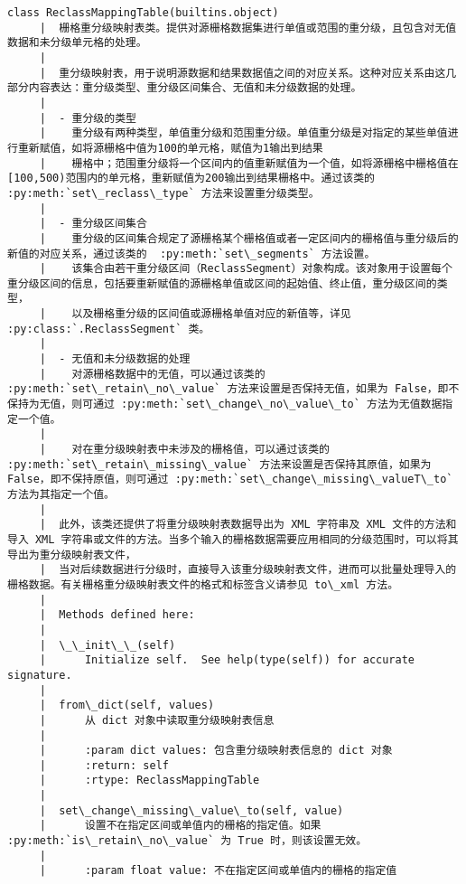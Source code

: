 \documentclass[11pt]{article}
\begin{document}
\begin{Verbatim}[commandchars=\\\{\}]
    class ReclassMappingTable(builtins.object)
     |  栅格重分级映射表类。提供对源栅格数据集进行单值或范围的重分级，且包含对无值数据和未分级单元格的处理。
     |  
     |  重分级映射表，用于说明源数据和结果数据值之间的对应关系。这种对应关系由这几部分内容表达：重分级类型、重分级区间集合、无值和未分级数据的处理。
     |  
     |  - 重分级的类型
     |    重分级有两种类型，单值重分级和范围重分级。单值重分级是对指定的某些单值进行重新赋值，如将源栅格中值为100的单元格，赋值为1输出到结果
     |    栅格中；范围重分级将一个区间内的值重新赋值为一个值，如将源栅格中栅格值在[100,500)范围内的单元格，重新赋值为200输出到结果栅格中。通过该类的 :py:meth:`set\_reclass\_type` 方法来设置重分级类型。
     |  
     |  - 重分级区间集合
     |    重分级的区间集合规定了源栅格某个栅格值或者一定区间内的栅格值与重分级后的新值的对应关系，通过该类的  :py:meth:`set\_segments` 方法设置。
     |    该集合由若干重分级区间（ReclassSegment）对象构成。该对象用于设置每个重分级区间的信息，包括要重新赋值的源栅格单值或区间的起始值、终止值，重分级区间的类型，
     |    以及栅格重分级的区间值或源栅格单值对应的新值等，详见 :py:class:`.ReclassSegment` 类。
     |  
     |  - 无值和未分级数据的处理
     |    对源栅格数据中的无值，可以通过该类的 :py:meth:`set\_retain\_no\_value` 方法来设置是否保持无值，如果为 False，即不保持为无值，则可通过 :py:meth:`set\_change\_no\_value\_to` 方法为无值数据指定一个值。
     |  
     |    对在重分级映射表中未涉及的栅格值，可以通过该类的 :py:meth:`set\_retain\_missing\_value` 方法来设置是否保持其原值，如果为 False，即不保持原值，则可通过 :py:meth:`set\_change\_missing\_valueT\_to` 方法为其指定一个值。
     |  
     |  此外，该类还提供了将重分级映射表数据导出为 XML 字符串及 XML 文件的方法和导入 XML 字符串或文件的方法。当多个输入的栅格数据需要应用相同的分级范围时，可以将其导出为重分级映射表文件，
     |  当对后续数据进行分级时，直接导入该重分级映射表文件，进而可以批量处理导入的栅格数据。有关栅格重分级映射表文件的格式和标签含义请参见 to\_xml 方法。
     |  
     |  Methods defined here:
     |  
     |  \_\_init\_\_(self)
     |      Initialize self.  See help(type(self)) for accurate signature.
     |  
     |  from\_dict(self, values)
     |      从 dict 对象中读取重分级映射表信息
     |      
     |      :param dict values: 包含重分级映射表信息的 dict 对象
     |      :return: self
     |      :rtype: ReclassMappingTable
     |  
     |  set\_change\_missing\_value\_to(self, value)
     |      设置不在指定区间或单值内的栅格的指定值。如果 :py:meth:`is\_retain\_no\_value` 为 True 时，则该设置无效。
     |      
     |      :param float value: 不在指定区间或单值内的栅格的指定值

\end{Verbatim}
\end{document}
